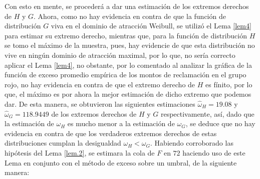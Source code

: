 \documentclass[10.5pt,notitlepage]{article}
\theoremstyle{plain}
\begin{document}
Con esto en mente, se procederá a dar una estimación de los extremos derechos de $H$ y $G$. Ahora, como no hay evidencia en contra de que la función de distribución $G$ viva en el dominio de atracción Weibull, se utilizó el Lema \ref{lem4} para estimar su extremo derecho, mientras que, para la función de distribución $H$ se tomo el máximo de la muestra, pues, hay evidencie de que esta distribución no vive en ningún dominio de atracción maximal, por lo que, no sería correcto aplicar el Lema \ref{lem4}, no obstante, por lo comentado al analizar la gráfica de la función de exceso promedio empírica de los montos de reclamación en el grupo rojo, no hay evidencia en contra de que el extremo derecho de \(H\) es fínito, por lo que, el máximo es por ahora la mejor estimación de dicho extremo que podemos dar. De esta manera, se obtuvieron las siguientes estimaciones $\hat{\omega}_H=19.08$ y $\hat{\omega}_G=118.9449$ de los extremos derechos de \(H\) y \(G\) respectivamente, así, dado que la estimación de \(\omega_{H}\) es mucho menor a la estimación de \(\omega_{G}\), se deduce que no hay evidencia en contra de que los verdaderos extremos derechos de estas distribuciones cumplan la desigualdad \(\omega_{H} < \omega_{G}\). Habiendo corroborado las hipótesis del Lema \ref{lem.2}, se estimara la cola de \(F\) en $72$ haciendo uso de este Lema en conjunto con el método de exceso sobre un umbral, de la siguiente manera:
\end{document}
